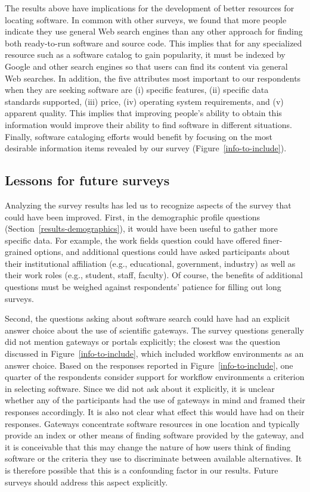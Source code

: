 \documentclass[review]{elsarticle}
\begin{document}
The results above have implications for the development of better resources for locating software.  In common with other surveys, we found that more people indicate they use general Web search engines than any other approach for finding both ready-to-run software and source code.  This implies that for any specialized resource such as a software catalog to gain popularity, it must be indexed by Google and other search engines so that users can find its content via general Web searches.  In addition, the five attributes most important to our respondents when they are seeking software are (i) specific features, (ii) specific data standards supported, (iii) price, (iv) operating system requirements, and (v) apparent quality.  This implies that improving people's ability to obtain this information would improve their ability to find software in different situations.  Finally, software cataloging efforts would benefit by focusing on the most desirable information items revealed by our survey (Figure~\ref{info-to-include}).


\subsection{Lessons for future surveys}

Analyzing the survey results has led us to recognize aspects of the survey that could have been improved.  First, in the demographic profile questions (Section~\ref{results-demographics}), it would have been useful to gather more specific data.  For example, the work fields question could have offered finer-grained options, and additional questions could have asked participants about their institutional affiliation (e.g., educational, government, industry) as well as their work roles (e.g., student, staff, faculty).  Of course, the benefits of additional questions must be weighed against respondents' patience for filling out long surveys.

Second, the questions asking about software search could have had an explicit answer choice about the use of scientific gateways.  The survey questions generally did not mention gateways or portals explicitly; the closest was the question discussed in Figure~\ref{info-to-include}, which included workflow environments as an answer choice.  Based on the responses reported in Figure~\ref{info-to-include}, one quarter of the respondents consider support for workflow environments a criterion in selecting software.  Since we did not ask about it explicitly, it is unclear whether any of the participants had the use of gateways in mind and framed their responses accordingly.  It is also not clear what effect this would have had on their responses.  Gateways concentrate software resources in one location and typically provide an index or other means of finding software provided by the gateway, and it is conceivable that this may change the nature of how users think of finding software or the criteria they use to discriminate between available alternatives.  It is therefore possible that this is a confounding factor in our results.  Future surveys should address this aspect explicitly.
\end{document}
